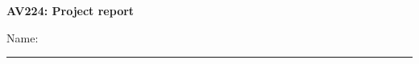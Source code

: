 \documentclass[10pt]{article}
\begin{document}
\begin{center}
\bf\large AV224: Project report
\end{center}

\noindent
Name:\\
\noindent
\rule{\textwidth}{1pt}

\medskip
\end{document}
